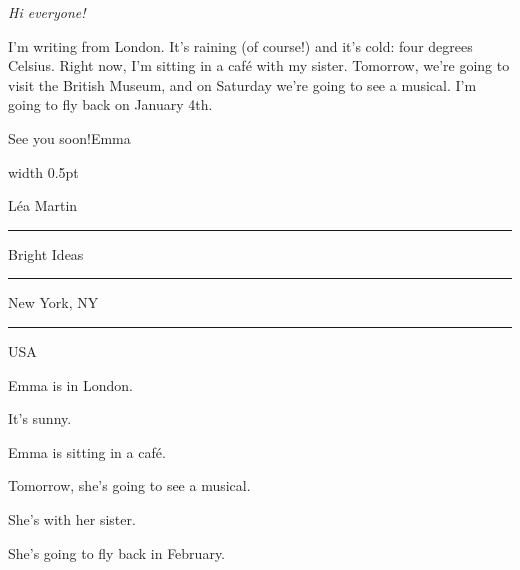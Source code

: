 \begin{anglais}
\begin{tcolorbox}[enhanced,width=140mm,center,colback=white,colframe=otRule,boxrule=0.6pt,arc=1mm,
  left=5mm,right=5mm,top=4mm,bottom=4mm,drop shadow={black!25,opacity=0.5}]
\begin{minipage}[t]{0.6\linewidth}\vspace{0pt}
\fontsize{10.4}{14}\selectfont\itshape
Hi everyone!\par
I'm writing from London. It's raining (of course!) and it's cold: four degrees Celsius. Right now,
I'm sitting in a café with my sister. Tomorrow, we're going to visit the British Museum, and on
Saturday we're going to see a musical. I'm going to fly back on January 4th.\par
See you soon!\quad Emma
\end{minipage}\hfill{\color{otRule}\vrule width 0.5pt}\hfill
\begin{minipage}[t]{0.32\linewidth}\vspace{0pt}
\raggedleft
{}\par\vspace{5mm}
\raggedright\fontsize{9.6}{14}\selectfont
Léa Martin\par\rule{\linewidth}{0.4pt}\par
Bright Ideas\par\rule{\linewidth}{0.4pt}\par
New York, NY\par\rule{\linewidth}{0.4pt}\par
USA
\end{minipage}
\end{tcolorbox}
\begin{questions}[2]
\item Emma is in London. \hfill{}
\item It's sunny. \hfill{}
\item Emma is sitting in a café. \hfill{}
\item Tomorrow, she's going to see a musical. \hfill{}
\item She's with her sister. \hfill{}
\item She's going to fly back in February. \hfill{}
\end{questions}
\end{anglais}

